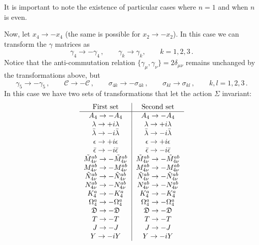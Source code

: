 \begin{appendix}
\noindent It is important to note the existence of particular cases where $n=1$ and when $n$ is even.


Now, let $x_{4}\to-x_{4}$ (the same is possible for $x_{2}\to-x_{2}$). In this case we can transform the $\gamma$ matrices as
\begin{equation}
\gamma_{4}\to-\gamma_{4}\,,\qquad\gamma_{k}\to\gamma_{k},\qquad k=1,2,3\,.
\end{equation}
Notice that the anti-commutation relation $\{\gamma_{\mu},\gamma_{\nu}\}=2\delta_{\mu\nu}$ remains unchanged by the transformations above, but
\begin{equation}
\gamma_{5}\to-\gamma_{5}\,,\qquad
\mathcal{C}\to-\mathcal{C}\,,\qquad
\sigma_{4k}\to-\sigma_{4k}\,,\qquad
\sigma_{kl}\to\sigma_{kl}\,,\qquad
k,l=1,2,3\,. 
\end{equation}
In this case we have two sets of transformations that let the action $\Sigma$ invariant:
\begin{equation}
\begin{tabular}{c|c}
First set&Second set\\
\hline
$A_{4}\to-A_{4}$&$A_{4}\to-A_{4}$\\
$\lambda\to+i\lambda$&$\lambda\to+i\lambda$\\
$\bar\lambda\to-i\bar\lambda$&$\bar\lambda\to-i\bar\lambda$\\
$\epsilon\to+i\epsilon$&$\epsilon\to+i\epsilon$\\
$\bar\epsilon\to-i\bar\epsilon$&$\bar\epsilon\to-i\bar\epsilon$\\
$\tilde{M}^{ab}_{4\nu}\to-\tilde{M}^{ab}_{4\nu}$&$\tilde{M}^{ab}_{4\nu}\to-\tilde{M}^{ab}_{4\nu}$\\
$M^{ab}_{4\nu}\to -M^{ab}_{4\nu}$&$M^{ab}_{4\nu}\to-M^{ab}_{4\nu}$\\
$\tilde{N}^{ab}_{4\nu}\to-\tilde{N}^{ab}_{4\nu}$&$\tilde{N}^{ab}_{4\nu}\to-\tilde{N}^{ab}_{4\nu}$\\
$N^{ab}_{4\nu}\to-N^{ab}_{4\nu}$&$N^{ab}_{4\nu}\to-N^{ab}_{4\nu}$\\
$K^{a}_{4} \to - K^{a}_{4}$&$K^{a}_{4} \to - K^{a}_{4}$\\
$\Omega^{a}_{4} \to - \Omega^{a}_{4}$&$\Omega^{a}_{4} \to - \Omega^{a}_{4}$\\
$\mathfrak{D}\to-\mathfrak{D}$&$\mathfrak{D}\to-\mathfrak{D}$\\
${T}\to-{T}$&${T}\to-{T}$\\
$J\to-J$&$J\to-J$\\
$Y\to-iY$&$Y\to-iY$\\

\end{tabular}
\end{equation}
\end{appendix}
